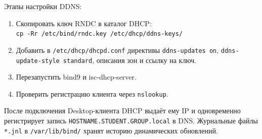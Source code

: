 Этапы настройки DDNS:
\begin{enumerate}
  \item Скопировать ключ RNDC в каталог DHCP:\\
        \texttt{cp -Rr /etc/bind/rndc.key /etc/dhcp/ddns-keys/}
  \item Добавить в \texttt{/etc/dhcp/dhcpd.conf} директивы
        \texttt{ddns-updates on}, \texttt{ddns-update-style standard},
        описания зон и ссылку на ключ.
  \item Перезапустить bind9 и isc-dhcp-server.
  \item Проверить регистрацию клиента через \texttt{nslookup}.
\end{enumerate}

После подключения Desktop-клиента DHCP выдаёт ему IP и одновременно
регистрирует запись \texttt{HOSTNAME.STUDENT.GROUP.local} в DNS.
Журнальные файлы \texttt{*.jnl} в \texttt{/var/lib/bind/} хранят историю
динамических обновлений.

\endinput
